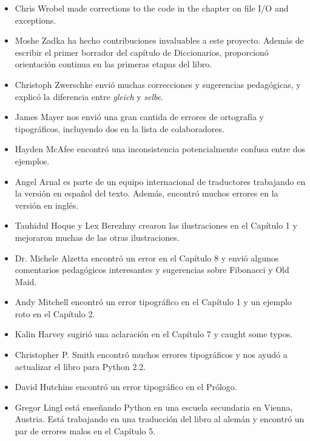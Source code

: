 \documentclass[10pt]{book}
\begin{document}
\begin{itemize}
\item Chris Wrobel made corrections to the code in the chapter on
file I/O and exceptions.

\item Moshe Zadka ha hecho contribuciones invaluables a este proyecto.
Además de escribir el primer borrador del capítulo de Diccionarios,
proporcionó orientación continua en las primeras etapas del libro.

\item Christoph Zwerschke envió muchas correcciones y
sugerencias pedagógicas, y explicó la diferencia entre {\em gleich}
y {\em selbe}.

\item James Mayer nos envió una gran cantida de errores de ortografía
y tipográficos, incluyendo dos en la lista de colaboradores.

\item Hayden McAfee encontró una inconsistencia potencialmente confusa
entre dos ejemplos.

\item Angel Arnal es parte de un equipo internacional de traductores
trabajando en la versión en español del texto.  Además, encontró muchos
errores en la versión en inglés.

\item Tauhidul Hoque y Lex Berezhny crearon las ilustraciones
en el Capítulo 1 y mejoraron muchas de las otras ilustraciones.

\item Dr. Michele Alzetta encontró un error en el Capítulo 8 y envió
algunos comentarios pedagógicos interesantes y sugerencias sobre Fibonacci
y Old Maid.

\item Andy Mitchell encontró un error tipográfico en el Capítulo 1 y un ejemplo roto
en el Capítulo 2.

\item Kalin Harvey sugirió una aclaración en el Capítulo 7 y
caught some typos.

\item Christopher P. Smith encontró muchos errores tipográficos y nos ayudó a
actualizar el libro para Python 2.2.

\item David Hutchins encontró un error tipográfico en el Prólogo.

\item Gregor Lingl está enseñando Python en una escuela secundaria en Vienna,
Austria.  Está trabajando en una traducción del libro al alemán
y encontró un par de errores malos en el Capítulo 5.


\end{itemize}
\end{document}
